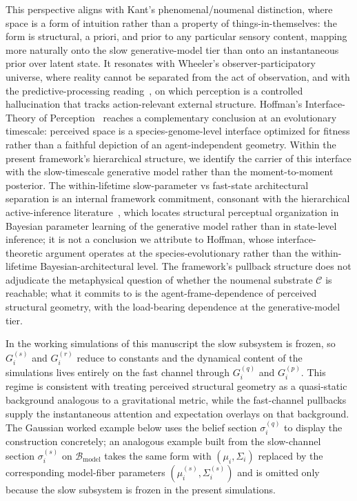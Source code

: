\documentclass[11pt]{article}
\begin{document}
This perspective aligns with Kant's phenomenal/noumenal distinction, where space is a form of intuition rather than a property of things-in-themselves: the form is structural, a priori, and prior to any particular sensory content, mapping more naturally onto the slow generative-model tier than onto an instantaneous prior over latent state. It resonates with Wheeler's observer-participatory universe, where reality cannot be separated from the act of observation, and with the predictive-processing reading~\cite{Clark2016, Seth2021}, on which perception is a controlled hallucination that tracks action-relevant external structure. Hoffman's Interface-Theory of Perception~\cite{Hoffman2019} reaches a complementary conclusion at an evolutionary timescale: perceived space is a species-genome-level interface optimized for fitness rather than a faithful depiction of an agent-independent geometry. Within the present framework's hierarchical structure, we identify the carrier of this interface with the slow-timescale generative model rather than the moment-to-moment posterior. The within-lifetime slow-parameter vs fast-state architectural separation is an internal framework commitment, consonant with the hierarchical active-inference literature~\cite{Friston2017}, which locates structural perceptual organization in Bayesian parameter learning of the generative model rather than in state-level inference; it is not a conclusion we attribute to Hoffman, whose interface-theoretic argument operates at the species-evolutionary rather than the within-lifetime Bayesian-architectural level. The framework's pullback structure does not adjudicate the metaphysical question of whether the noumenal substrate $\mathcal{C}$ is reachable; what it commits to is the agent-frame-dependence of perceived structural geometry, with the load-bearing dependence at the generative-model tier.

In the working simulations of this manuscript the slow subsystem is frozen, so $G_i^{(s)}$ and $G_i^{(r)}$ reduce to constants and the dynamical content of the simulations lives entirely on the fast channel through $G_i^{(q)}$ and $G_i^{(p)}$. This regime is consistent with treating perceived structural geometry as a quasi-static background analogous to a gravitational metric, while the fast-channel pullbacks supply the instantaneous attention and expectation overlays on that background. The Gaussian worked example below uses the belief section $\sigma_i^{(q)}$ to display the construction concretely; an analogous example built from the slow-channel section $\sigma_i^{(s)}$ on $\mathcal{B}_{\mathrm{model}}$ takes the same form with $(\mu_i, \Sigma_i)$ replaced by the corresponding model-fiber parameters $(\mu_i^{(s)}, \Sigma_i^{(s)})$ and is omitted only because the slow subsystem is frozen in the present simulations.
\end{document}
